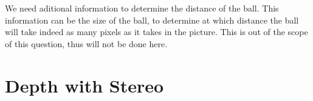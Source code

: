 \documentclass[a4paper]{iacas}
\begin{document}
We need aditional information to determine the distance of the ball. This information can be the size of the ball, to determine at which distance the ball will take indeed as many pixels as it takes in the picture. This is out of the scope of this question, thus will not be done here. 







\section{Depth with Stereo}
\end{document}
